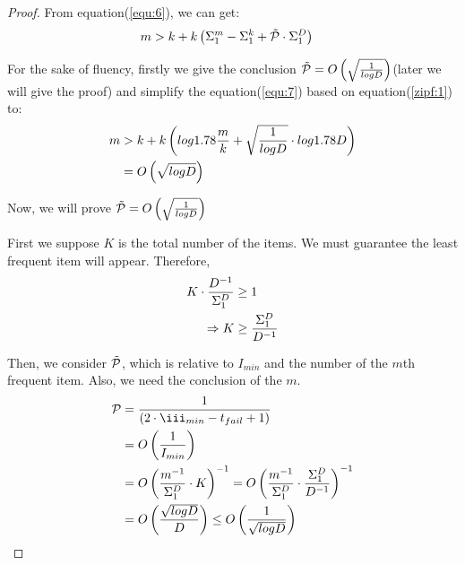 \begin{proof}
From equation(\ref{equ:6}), we can get:
\begin{equation}
\begin{aligned}
\centering 
\label{equ:7}
m &> k + k\left(\Sigma_1^m-\Sigma_1^k+\Tilde{\mathcal{P}}\cdot\Sigma_1^D\right)
\end{aligned}
\end{equation}

For the sake of fluency, firstly we give the conclusion $\Tilde{\mathcal{P}}=O\left(\sqrt{\frac{1}{logD}}\right)$(later we will give the proof) and simplify the equation(\ref{equ:7}) based on equation(\ref{zipf:1}) to:
\begin{equation}
\begin{aligned}
\centering  
m &> k + k\left(log1.78\frac{m}{k} + \sqrt{\frac{1}{logD}}\cdot log1.78D\right)\\ 
&= O\left(\sqrt{logD}\right)
\end{aligned}
\end{equation}

Now, we will prove $\Tilde{\mathcal{P}}=O\left(\sqrt{\frac{1}{logD}}\right)$

First we suppose $K$ is the total number of the items. We must guarantee the least frequent item will appear. Therefore,
\begin{equation}
\begin{aligned}
\centering  
    K\cdot\frac{D^{-1}}{\Sigma_1^D}&\geq1\\
    \Rightarrow K&\geq\frac{\Sigma_1^D}{D^{-1}}  
\end{aligned}
\end{equation}

Then, we consider $\Tilde{\mathcal{P}}$, which is relative to $I_{min}$ and the number of the $m$th frequent item. Also, we need the conclusion of the $m$.
\begin{equation}
\begin{aligned}
\centering  
\mathcal{P}&=\frac{1}{(2\cdot\iii_{min}-t_{fail}+1)}\\
&=O\left(\frac{1}{I_{min}}\right)\\
&=O\left(\frac{m^{-1}}{\Sigma_1^D}\cdot K\right)^{-1}=O\left(\frac{m^{-1}}{\Sigma_1^D}\cdot \frac{\Sigma_1^D}{D^{-1}}\right)^{-1}\\
&=O\left(\frac{\sqrt{logD}}{D}\right)\leq O\left(\frac{1}{\sqrt{logD}}\right)
\end{aligned}
\end{equation}
\end{proof}

